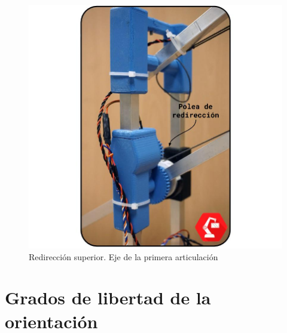     \begin{minipage}{0.47\textwidth}\raggedright
        \begin{figure}[H]
            \centering
            \includegraphics[width=\textwidth]{figuras/Imagenes_Mecanica/foto_brazo_8.jpg}
            \caption{Redirección superior. Eje de la primera articulación}
            \label{fig:Mecanica:redireccion_2}
        \end{figure}
    \end{minipage}

\section{Grados de libertad de la orientación}
